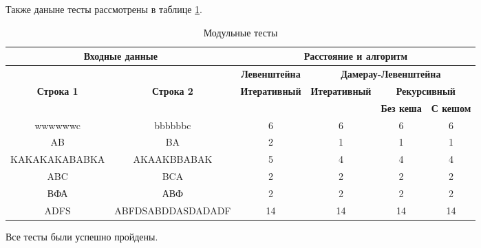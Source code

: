 Также даныне тесты рассмотрены в таблице \ref{t:unit_tests}.

\begin{table}[ht]
	\small
	\begin{center}
		\begin{threeparttable}
		\caption{Модульные тесты}
        \label{t:unit_tests}
        \fontsize{6pt}{6pt}
		\begin{tabular}{|c|c|c|c|c|c|}
			\multicolumn{2}{|c|}{\bfseries Входные данные}
			& \multicolumn{4}{c|}{\bfseries Расстояние и алгоритм} \\ 
			\hline 
			&
			& \multicolumn{1}{c|}{\bfseries Левенштейна} 
			& \multicolumn{3}{c|}{\bfseries Дамерау-Левенштейна} \\ \cline{3-6}
			
			\bfseries Строка 1 & \bfseries Строка 2 & \bfseries Итеративный & \bfseries Итеративный
			
			& \multicolumn{2}{c|}{\bfseries Рекурсивный} \\ \cline{5-6}
			& & & & \bfseries Без кеша & \bfseries С кешом \\
			\hline
			wwwwwwc & bbbbbbc & 6 & 6 & 6 & 6 \\
			\hline
			AB & BA & 2 & 1 & 1 & 1 \\
			\hline
			KAKAKAKABABKA & AKAAKBBABAK & 5 & 4 & 4 & 4 \\
			\hline
			ABC & BCA & 2 & 2 & 2 & 2 \\
			\hline
			ВФА & АВФ & 2 & 2 & 2 & 2 \\
			\hline
			ADFS & ABFDSABDDASDADADF & 14 & 14 & 14 & 14 \\
			\hline
		\end{tabular}	
		\end{threeparttable}
	\end{center}
\end{table}

Все тесты были успешно пройдены.